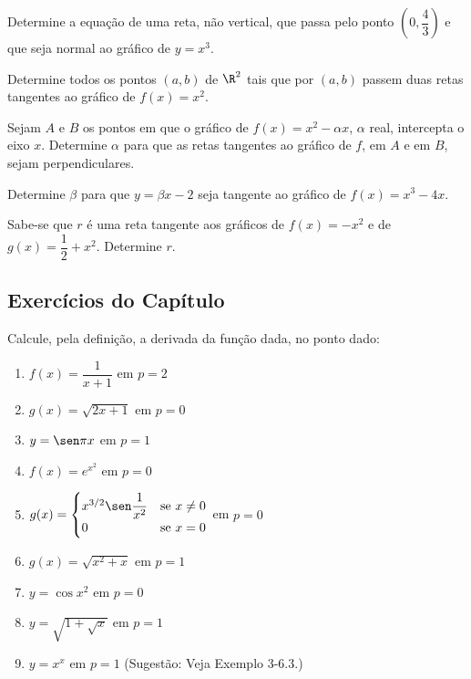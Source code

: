 \begin{exercicio}[11]
Determine a equação de uma reta, não vertical, que passa pelo ponto $\left(0, \dfrac{4}{3}\right)$ e que seja normal ao gráfico de $y = x^3$.
\end{exercicio}

\begin{exercicio}[12]
Determine todos os pontos $(a, b)$ de $\R^2$ tais que por $(a, b)$ passem duas retas tangentes ao gráfico de $f(x) = x^2$.
\end{exercicio}

\begin{exercicio}[13]
Sejam $A$ e $B$ os pontos em que o gráfico de $f(x) = x^2 - \alpha x$, $\alpha$ real, intercepta o eixo $x$. Determine $\alpha$ para que as retas tangentes ao gráfico de $f$, em $A$ e em $B$, sejam perpendiculares.
\end{exercicio}

\begin{exercicio}[14]
Determine $\beta$ para que $y = \beta x - 2$ seja tangente ao gráfico de $f(x) = x^3 - 4x$.
\end{exercicio}

\begin{exercicio}[15]
Sabe-se que $r$ é uma reta tangente aos gráficos de $f(x) = -x^2$ e de $g(x) = \dfrac{1}{2} + x^2$. Determine $r$.
\end{exercicio}

\clearpage

\subsection{Exercícios do Capítulo}

\begin{exercicio}[1]
Calcule, pela definição, a derivada da função dada, no ponto dado:
\begin{enumerate}[label=\alph*)]
    \item $f(x) = \dfrac{1}{x + 1}$ em $p = 2$
    \item $g(x) = \sqrt{2x + 1}$ em $p = 0$
    \item $y = \sen \pi x$ em $p = 1$
    \item $f(x) = e^{x^2}$ em $p = 0$
    \item $g(x) = \begin{cases} x^{3/2} \sen \dfrac{1}{x^2} & \text{se } x \neq 0 \\ 0 & \text{se } x = 0 \end{cases}$ em $p = 0$
    \item $g(x) = \sqrt{x^2 + x}$ em $p = 1$
    \item $y = \cos x^2$ em $p = 0$
    \item $y = \sqrt{1 + \sqrt{x}}$ em $p = 1$
    \item $y = x^x$ em $p = 1$ (Sugestão: Veja Exemplo 3-6.3.)
\end{enumerate}
\end{exercicio}

